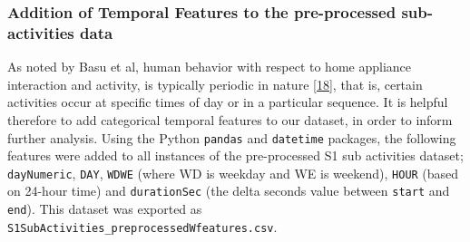 \documentclass[11pt,]{article}
\begin{document}
\hypertarget{addition-of-temporal-features-to-the-pre-processed-sub-activities-data}{%
\subsubsection{Addition of Temporal Features to the pre-processed
sub-activities
data}\label{addition-of-temporal-features-to-the-pre-processed-sub-activities-data}}

As noted by Basu et al, human behavior with respect to home appliance
interaction and activity, is typically periodic in nature
{[}\protect\hyperlink{ref-kaustavbasuApplianceUsagePrediction2012}{18}{]},
that is, certain activities occur at specific times of day or in a
particular sequence. It is helpful therefore to add categorical temporal
features to our dataset, in order to inform further analysis. Using the
Python \texttt{pandas} and \texttt{datetime} packages, the following
features were added to all instances of the pre-processed S1 sub
activities dataset; \texttt{dayNumeric}, \texttt{DAY}, \texttt{WDWE}
(where WD is weekday and WE is weekend), \texttt{HOUR} (based on 24-hour
time) and \texttt{durationSec} (the delta seconds value between
\texttt{start} and \texttt{end}). This dataset was exported as
\texttt{S1SubActivities\_preprocessedWfeatures.csv}.
\end{document}
